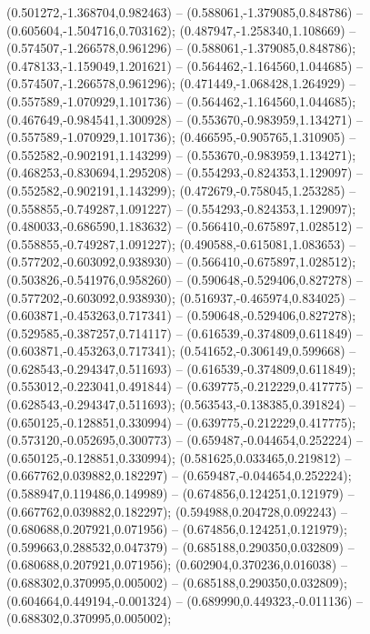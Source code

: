  (0.501272,-1.368704,0.982463) -- (0.588061,-1.379085,0.848786) -- (0.605604,-1.504716,0.703162);
 (0.487947,-1.258340,1.108669) -- (0.574507,-1.266578,0.961296) -- (0.588061,-1.379085,0.848786);
 (0.478133,-1.159049,1.201621) -- (0.564462,-1.164560,1.044685) -- (0.574507,-1.266578,0.961296);
 (0.471449,-1.068428,1.264929) -- (0.557589,-1.070929,1.101736) -- (0.564462,-1.164560,1.044685);
 (0.467649,-0.984541,1.300928) -- (0.553670,-0.983959,1.134271) -- (0.557589,-1.070929,1.101736);
 (0.466595,-0.905765,1.310905) -- (0.552582,-0.902191,1.143299) -- (0.553670,-0.983959,1.134271);
 (0.468253,-0.830694,1.295208) -- (0.554293,-0.824353,1.129097) -- (0.552582,-0.902191,1.143299);
 (0.472679,-0.758045,1.253285) -- (0.558855,-0.749287,1.091227) -- (0.554293,-0.824353,1.129097);
 (0.480033,-0.686590,1.183632) -- (0.566410,-0.675897,1.028512) -- (0.558855,-0.749287,1.091227);
 (0.490588,-0.615081,1.083653) -- (0.577202,-0.603092,0.938930) -- (0.566410,-0.675897,1.028512);
 (0.503826,-0.541976,0.958260) -- (0.590648,-0.529406,0.827278) -- (0.577202,-0.603092,0.938930);
 (0.516937,-0.465974,0.834025) -- (0.603871,-0.453263,0.717341) -- (0.590648,-0.529406,0.827278);
 (0.529585,-0.387257,0.714117) -- (0.616539,-0.374809,0.611849) -- (0.603871,-0.453263,0.717341);
 (0.541652,-0.306149,0.599668) -- (0.628543,-0.294347,0.511693) -- (0.616539,-0.374809,0.611849);
 (0.553012,-0.223041,0.491844) -- (0.639775,-0.212229,0.417775) -- (0.628543,-0.294347,0.511693);
 (0.563543,-0.138385,0.391824) -- (0.650125,-0.128851,0.330994) -- (0.639775,-0.212229,0.417775);
 (0.573120,-0.052695,0.300773) -- (0.659487,-0.044654,0.252224) -- (0.650125,-0.128851,0.330994);
 (0.581625,0.033465,0.219812) -- (0.667762,0.039882,0.182297) -- (0.659487,-0.044654,0.252224);
 (0.588947,0.119486,0.149989) -- (0.674856,0.124251,0.121979) -- (0.667762,0.039882,0.182297);
 (0.594988,0.204728,0.092243) -- (0.680688,0.207921,0.071956) -- (0.674856,0.124251,0.121979);
 (0.599663,0.288532,0.047379) -- (0.685188,0.290350,0.032809) -- (0.680688,0.207921,0.071956);
 (0.602904,0.370236,0.016038) -- (0.688302,0.370995,0.005002) -- (0.685188,0.290350,0.032809);
 (0.604664,0.449194,-0.001324) -- (0.689990,0.449323,-0.011136) -- (0.688302,0.370995,0.005002);
